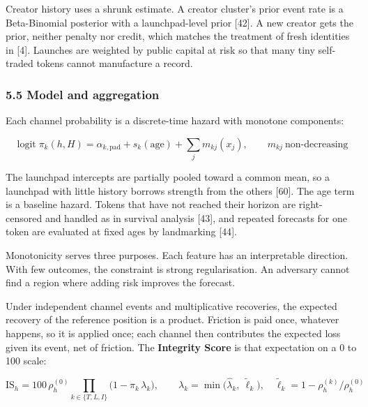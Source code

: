 Creator history uses a shrunk estimate. A creator cluster's prior event rate is a Beta-Binomial posterior with a launchpad-level prior {[}42{]}. A new creator gets the prior, neither penalty nor credit, which matches the treatment of fresh identities in {[}4{]}. Launches are weighted by public capital at risk so that many tiny self-traded tokens cannot manufacture a record.

\subsubsection{5.5 Model and aggregation}\label{model-and-aggregation}

Each channel probability is a discrete-time hazard with monotone components:

\[
\operatorname{logit} \pi_k(h, H) = \alpha_{k,\mathrm{pad}} + s_k(\mathrm{age}) + \sum_j m_{kj}(x_j), \qquad m_{kj} \ \text{non-decreasing}
\]

The launchpad intercepts are partially pooled toward a common mean, so a launchpad with little history borrows strength from the others {[}60{]}. The age term is a baseline hazard. Tokens that have not reached their horizon are right-censored and handled as in survival analysis {[}43{]}, and repeated forecasts for one token are evaluated at fixed ages by landmarking {[}44{]}.

Monotonicity serves three purposes. Each feature has an interpretable direction. With few outcomes, the constraint is strong regularisation. An adversary cannot find a region where adding risk improves the forecast.

Under independent channel events and multiplicative recoveries, the expected recovery of the reference position is a product. Friction is paid once, whatever happens, so it is applied once; each channel then contributes the expected loss given its event, net of friction. The \textbf{Integrity Score} is that expectation on a 0 to 100 scale:

\[
\mathrm{IS}_h = 100\, \rho_h^{(0)} \prod_{k \in \{T, L, I\}} \bigl(1 - \pi_k \, \lambda_k\bigr), \qquad \lambda_k = \min\bigl(\hat\lambda_k,\ \tilde\ell_k\bigr), \quad \tilde\ell_k = 1 - \rho_h^{(k)} / \rho_h^{(0)}
\]

